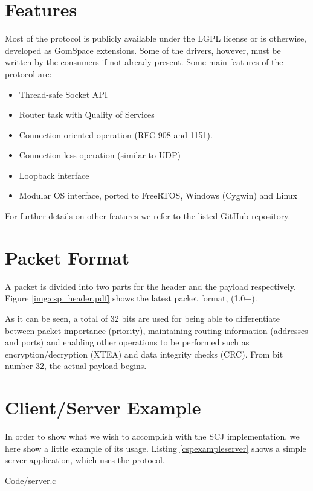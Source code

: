 \section{Features}
Most of the protocol is publicly available under the LGPL license or is otherwise, developed as GomSpace extensions. Some of the drivers, however, must be written by the consumers if not already present. Some main features of the protocol are:

\begin{itemize}
	\item Thread-safe Socket API
	\item Router task with Quality of Services
	\item Connection-oriented operation (RFC 908 and 1151).
	\item Connection-less operation (similar to UDP)
	\item Loopback interface
	\item Modular OS interface, ported to FreeRTOS, Windows (Cygwin) and Linux
\end{itemize}

For further details on other features we refer to the listed GitHub repository.

\section{Packet Format}
A packet is divided into two parts for the header and the payload respectively. Figure \ref{img:csp_header.pdf} shows the latest packet format, (1.0+).


As it can be seen, a total of 32 bits are used for being able to differentiate between packet importance (priority), maintaining routing information (addresses and ports) and enabling other operations to be performed such as encryption/decryption (XTEA) and data integrity checks (CRC). From bit number 32, the actual payload begins.

\section{Client/Server Example}
In order to show what we wish to accomplish with the SCJ implementation, we here show a little example of its usage. Listing \ref{cspexampleserver} shows a simple server application, which uses the protocol. 


{Code/server.c}

